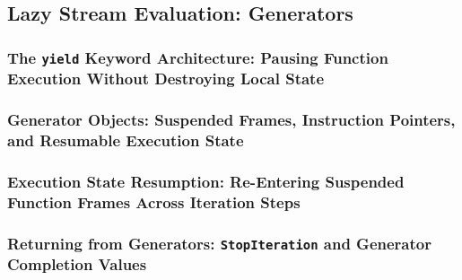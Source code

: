 \subsection{Lazy Stream Evaluation: Generators}
\subsubsection{The \texttt{yield} Keyword Architecture: Pausing Function Execution Without Destroying Local State}
\subsubsection{Generator Objects: Suspended Frames, Instruction Pointers, and Resumable Execution State}
\subsubsection{Execution State Resumption: Re-Entering Suspended Function Frames Across Iteration Steps}
\subsubsection{Returning from Generators: \texttt{StopIteration} and Generator Completion Values}
